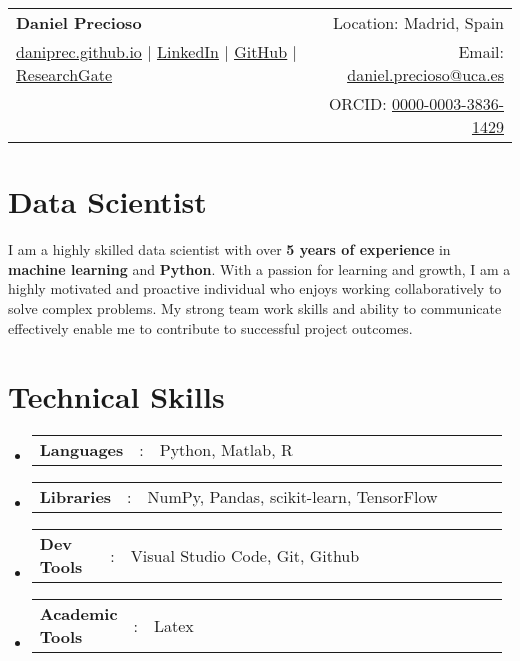 \documentclass[a4paper,11pt]{article}
\newcommand{\resumeSectionType}[3]{
	\item\begin{tabular*}{0.96\textwidth}[t]{
			p{0.15\linewidth}p{0.02\linewidth}p{0.81\linewidth}
		}
		\textbf{#1} & #2 & #3
	\end{tabular*}\vspace{-2pt}
}
\newcommand{\resumeHeadingListStart}{
	\begin{itemize}[leftmargin=0.15in, label={}]
	}
\newcommand{\resumeHeadingListEnd}{\end{itemize}}
\begin{document}
	
	
	\begin{tabular*}{\textwidth}{l@{\extracolsep{\fill}}r}
		\textbf{\Huge Daniel Precioso \vspace{2pt}} & %
		Location: Madrid, Spain \\ %
		\href{https://daniprec.github.io}{\uline{daniprec.github.io}} $|$ %
		\href{https://www.linkedin.com/in/daniel-precioso-garcelan}{\uline{LinkedIn}} $|$ %
		\href{https://github.com/daniprec}{\uline{GitHub}} %
		$|$ \href{https://www.researchgate.net/profile/Daniel-Precioso-Garcelan}{\uline{ResearchGate}} %
		& %
		Email: \href{mailto:daniel.precioso@uca.es}{\uline{daniel.precioso@uca.es}} \\ %
		& %
		ORCID: \href{https://orcid.org/0000-0003-3836-1429}{\uline{0000-0003-3836-1429}} \\ %
	\end{tabular*}
	
	
	
	\section{Data Scientist}
		 I am a highly skilled data scientist with over \textbf{5 years of experience} in \textbf{machine learning} and \textbf{Python}. With a passion for learning and growth, I am a highly motivated and proactive individual who enjoys working collaboratively to solve complex problems. My strong team work skills and ability to communicate effectively enable me to contribute to successful project outcomes.
	
	
	
	\section{Technical Skills}
	\resumeHeadingListStart{}
	\resumeSectionType{Languages}{:}{Python, Matlab, R}
	\resumeSectionType{Libraries}{:}{NumPy, Pandas, scikit-learn, TensorFlow}
	\resumeSectionType{Dev Tools}{:}{Visual Studio Code, Git, Github}
	\resumeSectionType{Academic Tools}{:}{Latex}
	\resumeHeadingListEnd{}
	
\end{document}
